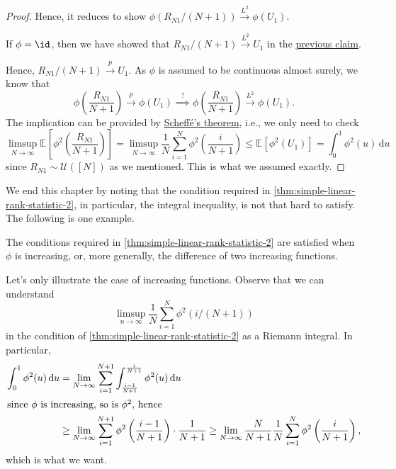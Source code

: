 \begin{proof}
	Hence, it reduces to show \(\phi ( R_{N1} / (N+1) ) \overset{L^2}{\to} \phi (U_1)\).

	\begin{intuition}
		If \(\phi = \id \), then we have showed that \(R_{N1} / (N+1) \overset{L^2}{\to} U_1\) in the \hyperref[clm:simple-linear-rank-statistic]{previous claim}.
	\end{intuition}

	Hence, \(R_{N1} / (N+1) \overset{p}{\to} U_1\). As \(\phi \) is assumed to be continuous almost surely, we know that
	\[
		\phi \left( \frac{R_{N1}}{N+1} \right)
		\overset{p}{\to} \phi (U_1)
		\overset{?}{\implies } \phi \left( \frac{R_{N1}}{N+1} \right) \overset{L^2}{\to} \phi (U_1).
	\]
	The implication can be provided by \hyperref[thm:Scheffe]{Scheffé's theorem}, i.e., we only need to check
	\[
		\limsup_{N \to \infty} \mathbb{E}_{}\left[\phi ^2\left( \frac{R_{N1}}{N+1} \right) \right]
		= \limsup_{N \to \infty} \frac{1}{N} \sum_{i=1}^{N} \phi ^2 \left( \frac{i}{N+1} \right)
		\leq \mathbb{E}_{}[\phi ^2(U_1)]
		= \int_{0}^{1} \phi ^2(u) \,\mathrm{d}u
	\]
	since \(R_{N1} \sim \mathcal{U} ([N])\) as we mentioned. This is what we assumed exactly.
\end{proof}

We end this chapter by noting that the condition required in \autoref{thm:simple-linear-rank-statistic-2}, in particular, the integral inequality, is not that hard to satisfy. The following is one example.

\begin{eg}
	The conditions required in \autoref{thm:simple-linear-rank-statistic-2} are satisfied when \(\phi \) is increasing, or, more generally, the difference of two increasing functions.
\end{eg}
\begin{explanation}
	Let's only illustrate the case of increasing functions. Observe that we can understand
	\[
		\limsup_{n \to \infty} \frac{1}{N}\sum_{i=1}^{N} \phi ^2(i / (N+1))
	\]
	in the condition of \autoref{thm:simple-linear-rank-statistic-2} as a Riemann integral. In particular,
	\begin{align*}
		\int_{0}^{1} \phi ^2(u) \,\mathrm{d}u
		 & = \lim_{N \to \infty} \sum_{i=1}^{N+1} \int_{\frac{i-1}{N+1}}^{\frac{i}{N+1}} \phi ^2 (u) \,\mathrm{d}u \\
		\shortintertext{since \(\phi \) is increasing, so is \(\phi ^2\), hence}
		 & \geq \lim_{N \to \infty} \sum_{i=1}^{N+1} \phi ^2\left( \frac{i-1}{N+1} \right) \cdot \frac{1}{N+1}
		\geq \lim_{N \to \infty} \frac{N}{N+1} \frac{1}{N} \sum_{i=1}^{N} \phi ^2\left( \frac{i}{N+1} \right),
	\end{align*}
	which is what we want.
\end{explanation}